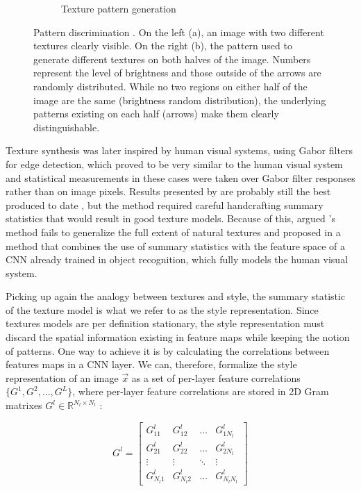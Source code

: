 \begin{figure}[htb]
\begin{subfigure}[b]{0.5\textwidth}
    \captionsetup{justification=centering}
    \caption{Texture pattern generation}
    \label{sub:system:method:style-reconstruction:texture-2}
  \end{subfigure}
  \caption{Pattern discrimination \cite{Julesz1962}.
    On the left (a), an image with two different textures clearly visible.
    On the right (b), the pattern used to generate different textures on both halves of the image.
    Numbers represent the level of brightness and those outside of the arrows are randomly distributed.
    While no two regions on either half of the image are the same (brightness random distribution), the underlying patterns existing on each half (arrows) make them clearly distinguishable.}
  \label{sub:system:method:style-reconstruction:texture}
\end{figure}

Texture synthesis was later inspired by human visual systems, using Gabor filters for edge detection, which proved to be very similar to the human visual system \cite{Heeger1995,Portilla2000} and statistical measurements in these cases were taken over Gabor filter responses rather than on image pixels.
Results presented by \citet{Portilla2000} are probably still the best produced to date \cite{Gatys2015A}, but the method required careful handcrafting summary statistics that would result in good texture models.
Because of this, \citeauthor{Gatys2015A} argued \citeauthor{Portilla2000}'s method fails to generalize the full extent of natural textures and proposed in \cite{Gatys2015A} a method that combines the use of summary statistics with the feature space of a CNN already trained in object recognition, which fully models the human visual system.

Picking up again the analogy between textures and style, the summary statistic of the texture model is what we refer to as the style representation.
Since textures models are per definition stationary, the style representation must discard the spatial information existing in feature maps while keeping the notion of patterns.
One way to achieve it is by calculating the correlations between features maps in a CNN layer.
We can, therefore, formalize the style representation of an image $\vec{x}$ as a set of per-layer feature correlations $\{G^1, G^2, \dots, G^L\}$, where per-layer feature correlations are stored in 2D Gram matrixes $G^l \in \mathbb{R}^{{N_l}\times{N_l}}$ \cite[Theorem~7.2.10]{Horn2012}:

\begin{equation}
  G^l =
  \begin{bmatrix}
    G^l_{11}   & G^l_{12}   & \dots  & G^l_{1N_l} \\
    G^l_{21}   & G^l_{22}   & \dots  & G^l_{2N_l} \\
    \vdots     & \vdots     & \ddots & \vdots   \\
    G^l_{N_l1} & G^l_{N_l2} & \dots  & G^l_{N_lN_l}
  \end{bmatrix}
\end{equation}

